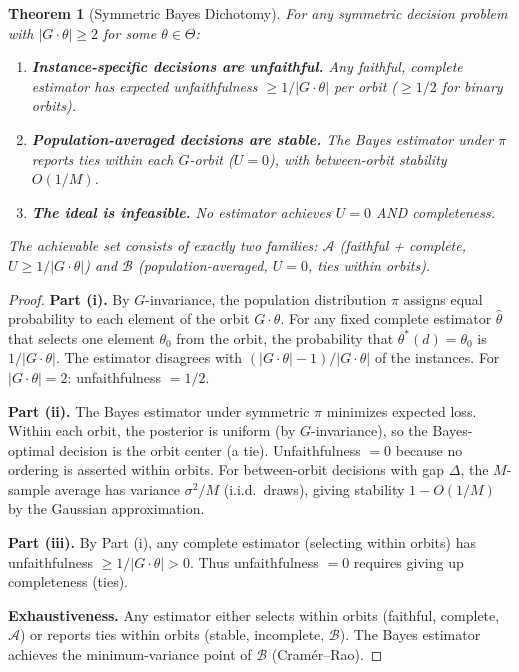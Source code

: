\documentclass{article}
\newtheorem{theorem}{Theorem}
\begin{document}
\begin{theorem}[Symmetric Bayes Dichotomy]
\label{thm:bayes-dichotomy}
For any symmetric decision problem with $|G \cdot \theta| \geq 2$ for some $\theta \in \Theta$:
\begin{enumerate}
    \item[(i)] \textbf{Instance-specific decisions are unfaithful.} Any faithful, complete estimator has expected unfaithfulness $\geq 1/|G \cdot \theta|$ per orbit ($\geq 1/2$ for binary orbits).
    \item[(ii)] \textbf{Population-averaged decisions are stable.} The Bayes estimator under $\pi$ reports ties within each $G$-orbit ($U = 0$), with between-orbit stability $O(1/M)$.
    \item[(iii)] \textbf{The ideal is infeasible.} No estimator achieves $U = 0$ AND completeness.
\end{enumerate}
The achievable set consists of exactly two families: $\mathcal{A}$ (faithful + complete, $U \geq 1/|G \cdot \theta|$) and $\mathcal{B}$ (population-averaged, $U = 0$, ties within orbits).
\end{theorem}

\begin{proof}
\textbf{Part (i).} By $G$-invariance, the population distribution $\pi$ assigns equal probability to each element of the orbit $G \cdot \theta$. For any fixed complete estimator $\hat\theta$ that selects one element $\theta_0$ from the orbit, the probability that $\theta^*(d) = \theta_0$ is $1/|G \cdot \theta|$. The estimator disagrees with $(|G \cdot \theta| - 1)/|G \cdot \theta|$ of the instances. For $|G \cdot \theta| = 2$: unfaithfulness $= 1/2$.

\textbf{Part (ii).} The Bayes estimator under symmetric $\pi$ minimizes expected loss. Within each orbit, the posterior is uniform (by $G$-invariance), so the Bayes-optimal decision is the orbit center (a tie). Unfaithfulness $= 0$ because no ordering is asserted within orbits. For between-orbit decisions with gap $\Delta$, the $M$-sample average has variance $\sigma^2/M$ (i.i.d.\ draws), giving stability $1 - O(1/M)$ by the Gaussian approximation.

\textbf{Part (iii).} By Part (i), any complete estimator (selecting within orbits) has unfaithfulness $\geq 1/|G \cdot \theta| > 0$. Thus unfaithfulness $= 0$ requires giving up completeness (ties).

\textbf{Exhaustiveness.} Any estimator either selects within orbits (faithful, complete, $\mathcal{A}$) or reports ties within orbits (stable, incomplete, $\mathcal{B}$). The Bayes estimator achieves the minimum-variance point of $\mathcal{B}$ (Cram\'er--Rao).
\end{proof}
\end{document}
